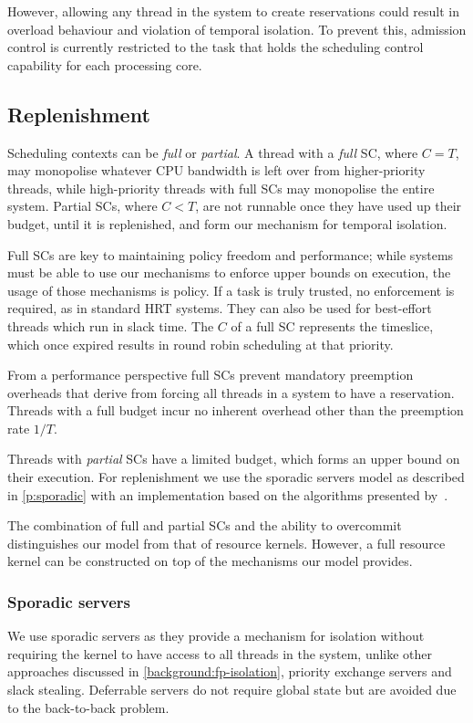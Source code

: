 However, allowing any thread in the system to create reservations could result in overload behaviour and violation of temporal isolation.
To prevent this, admission control is currently restricted to the task that holds the scheduling
control capability for each processing core.

\subsection{Replenishment}

Scheduling contexts can be \emph{full} or \emph{partial}. A thread with a \emph{full} SC, where
\(C=T\), may monopolise whatever
CPU bandwidth is left over from higher-priority threads, while high-priority threads with full
\glspl{SC} may monopolise the entire system. 
Partial \glspl{SC}, where \(C<T\), are not runnable once
they have used up their budget, until it is replenished, and form our mechanism for temporal
isolation.  

Full \glspl{SC} are key to maintaining policy freedom and performance; while systems
must be able to use our mechanisms to enforce upper bounds on execution, the usage of 
those mechanisms is policy. If a task is truly trusted, no enforcement is required,
as in standard \gls{HRT} systems. They can also be used for best-effort threads which run in slack time.
The \(C\) of a full \gls{SC} represents the timeslice, which once expired results in round robin
scheduling at that priority. 

From a performance perspective full \glspl{SC} prevent mandatory preemption overheads 
that derive from forcing all threads in a system to have a reservation. Threads with a full
budget incur no inherent overhead other than the preemption rate $1/T$.

Threads with \emph{partial} \glspl{SC} have a limited budget, which forms an upper
bound on their execution. For replenishment we
use the sporadic servers model as described in \cref{p:sporadic} with an
implementation based on the algorithms presented
by~\citet{Stanovic_BWH_10}. 

The combination of full and partial \glspl{SC}  and the ability to overcommit distinguishes our
model from that of resource kernels. However, a full resource kernel can be 
constructed on top of the mechanisms our model provides.

\subsubsection{Sporadic servers}
\label{s:sporadic}
We use sporadic servers as they provide a mechanism for isolation without requiring the kernel
to have access to all threads in the system, unlike other approaches discussed in
\cref{background:fp-isolation}, \eg  priority exchange servers and slack stealing.
Deferrable servers do not require global state but are avoided due to the back-to-back
problem. 

